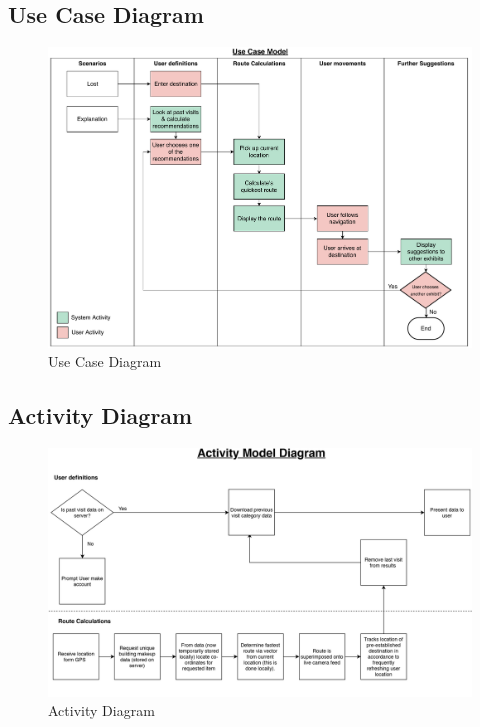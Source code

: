 
\subsection*{Use Case Diagram}
\begin{figure}[H]
    \centering
    \includegraphics[width=\textwidth]
    {assets/use_case.pdf}
    \caption{Use Case Diagram}
    \label{fig:Use Case Diagram}
\end{figure}

\subsection*{Activity Diagram}
\begin{figure}[H]
    \centering
    \includegraphics[width=\textwidth]
    {assets/Activity_Diagram.pdf}
    \caption{Activity Diagram}
    \label{fig:Activity Diagram}
\end{figure}
